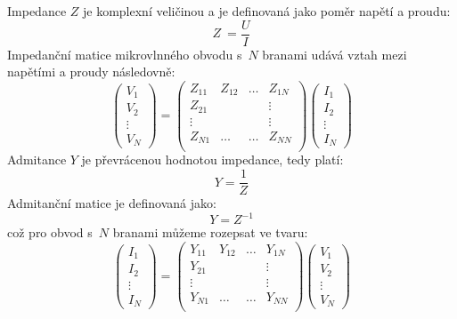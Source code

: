 \documentclass{protokol}
\begin{document}
Impedance $Z$ je komplexní veličinou a je definovaná jako poměr napětí a proudu:
\begin{equation}
	\label{eq:impedance}
	Z~= \frac{U}{I}
\end{equation}
Impedanční matice mikrovlnného obvodu s~$N$ branami
udává vztah mezi napětími a proudy následovně:
\begin{equation}
	\label{eq:zmatrix}
	\begin{pmatrix}
		V_1    \\
		V_2    \\
		\vdots \\
		V_N
	\end{pmatrix}
	=
	\begin{pmatrix}
		Z_{11} & Z_{12} & \dots & Z_{1N} \\
		Z_{21} &        &       & \vdots \\
		\vdots &        &       & \vdots \\
		Z_{N1} & \dots	& \dots & Z_{NN} \\
	\end{pmatrix}
	\begin{pmatrix}
		I_1    \\
		I_2    \\
		\vdots \\
		I_N
	\end{pmatrix}
\end{equation}
Admitance $Y$ je převrácenou hodnotou impedance, tedy platí:
\begin{equation}
	\label{eq:admittance}
	Y = \frac{1}{Z}
\end{equation}
Admitanční matice je definovaná jako:
\begin{equation}
	\label{eq:ymatrix-short}
	Y = Z^{-1}
\end{equation}
což pro obvod s~$N$ branami můžeme rozepsat ve tvaru:
\begin{equation}
	\label{eq:ymatrix-full}
	\begin{pmatrix}
		I_1    \\
		I_2    \\
		\vdots \\
		I_N
	\end{pmatrix}
	=
	\begin{pmatrix}
		Y_{11} & Y_{12} & \dots & Y_{1N} \\
		Y_{21} &        &       & \vdots \\
		\vdots &        &       & \vdots \\
		Y_{N1} & \dots	& \dots & Y_{NN} \\
	\end{pmatrix}
	\begin{pmatrix}
		V_1    \\
		V_2    \\
		\vdots \\
		V_N
	\end{pmatrix}
\end{equation}
\end{document}
